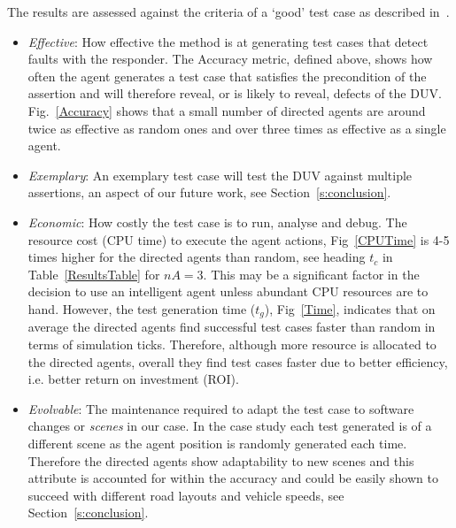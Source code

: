 \documentclass[letterpaper, 10 pt, journal, twoside]{IEEEtran}
\begin{document}

The results are assessed against the criteria of a `good' test case as described in~\cite{fewster1999software}.
\begin{itemize}
	\item \textit{Effective}: How effective the method is at generating test cases that detect faults with the responder. The Accuracy metric, defined above, shows how often the agent generates a test case that satisfies the precondition of the assertion and will therefore reveal, or is likely to reveal, defects of the DUV. Fig.~\ref{Accuracy} shows that a small number of directed agents are around twice as effective as random ones and over three times as effective as a single agent.
	\item \textit{Exemplary}: An exemplary test case will test the DUV against multiple assertions, an aspect of our future work, see Section~\ref{s:conclusion}. 
	\item \textit{Economic}: How costly the test case is to run, analyse and debug. The resource cost (CPU time) to execute the agent actions, Fig~\ref{CPUTime} is 4-5 times higher for the directed agents than random, see heading $t_{c}$ in Table~\ref{ResultsTable} for $nA=3$. This may be a significant factor in the decision to use an intelligent agent unless abundant CPU resources are to hand. %
	However, the test generation time ($t_g$), Fig~\ref{Time}, indicates that on average the directed agents find successful test cases faster than random in terms of simulation ticks. Therefore, although more resource is allocated to the directed agents, overall they find test cases faster due to better efficiency, i.e. better return on investment (ROI).
	\item \textit{Evolvable}: The maintenance required to adapt the test case to software changes or \textit{scenes} in our case. In the case study each test generated is of a different scene as the agent position is randomly generated each time. Therefore the directed agents show adaptability to new scenes and this attribute is accounted for within the accuracy and could be easily shown to succeed with different road layouts and vehicle speeds, see Section~\ref{s:conclusion}.
\end{itemize}
\end{document}
